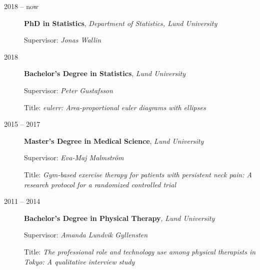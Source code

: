 \documentclass[
  10pt,
  headsepline=true,
  english,
  DIV=12
]{scrartcl}
\renewcommand*{%
  \mkbibnamegiven
}[1]{\ifitemannotation{highlight}{\textbf{#1}}{#1}}
\renewcommand*{%
  \mkbibnamefamily
}[1]{\ifitemannotation{highlight}{\textbf{#1}}{#1}}
\begin{document}
\begin{description}
  \item[2018 -- now] {
    \textbf{PhD in Statistics}, \emph{Department of Statistics, Lund
      University}

    Supervisor: \emph{Jonas Wallin}
    }

  \item[2018] {
    \textbf{Bachelor's Degree in Statistics}, \emph{Lund University}

    Supervisor: \emph{Peter Gustafsson}

    Title: \emph{eulerr: Area-proportional euler diagrams with ellipses}
    }

  \item[2015 -- 2017] {
    \textbf{Master's Degree in Medical Science}, \emph{Lund University}

    Supervisor: \emph{Eva-Maj Malmström}

    Title: \emph{Gym-based exercise therapy for patients with persistent
      neck pain: A research protocol for a randomized controlled trial}
    }

  \item[2011 -- 2014] {
    \textbf{Bachelor's Degree in Physical Therapy}, \emph{Lund University}

    Supervisor: \emph{Amanda Lundvik Gyllensten}

    Title: \emph{The professional role and technology use among physical
      therapists in Tokyo: A qualitative interview study}
    }
\end{description}





\end{document}
